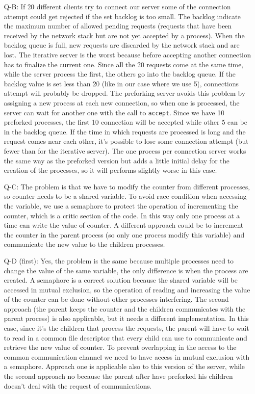 Q-B: If 20 different clients try to connect our server some of the connection attempt could get rejected if the set backlog is too small. The backlog indicate the maximum number of allowed pending requests (requests that have been received by the network stack but are not yet accepted by a process). When the backlog queue is full, new requests are discarded by the network stack and are lost. The iterative server is the worst because before accepting another connection has to finalize the current one. Since all the 20 requests come at the same time, while the server process the first, the others go into the backlog queue. If the backlog value is set less than 20 (like in our case where we use 5), connections attempt will probably be dropped. The preforking server avoids this problem by assigning a new process at each new connection, so when one is processed, the server can wait for another one with the call to \texttt{accept}. Since we have 10 preforked processes, the first 10 connection will be accepted while other 5 can be in the backlog queue. If the time in which requests are processed is long and the request comes near each other, it's possible to lose some connection attempt (but fewer than for the iterative server). The one process per connection server works the same way as the preforked version but adds a little initial delay for the creation of the processes, so it will performs slightly worse in this case. \newline

Q-C: The problem is that we have to modify the counter from different processes, so counter needs to be a shared variable. To avoid race condition when accessing the variable, we use a semaphore to protect the operation of incrementing the counter, which is a critic section of the code. In this way only one process at a time can write the value of counter. A different approach could be to increment the counter in the parent process (so only one process modify this variable) and communicate the new value to the children processes.\newline

Q-D (first): Yes, the problem is the same because multiple processes need to change the value of the same variable, the only difference is when the process are created. A semaphore is a correct solution because the shared variable will be accessed in mutual exclusion, so the operation of reading and increasing the value of the counter can be done without other processes interfering. The second approach (the parent keeps the counter and the children communicates with the parent process) is also applicable, but it needs a different implementation. In this case, since it's the children that process the requests, the parent will have to wait to read in a common file descriptor that every child can use to communicate and retrieve the new value of counter. To prevent overlapping in the access to the common communication channel we need to have access in mutual exclusion with a semaphore.
Approach one is applicable also to this version of the server, while the second approach no because the parent after have preforked his children doesn't deal with the request of communications. \newline


